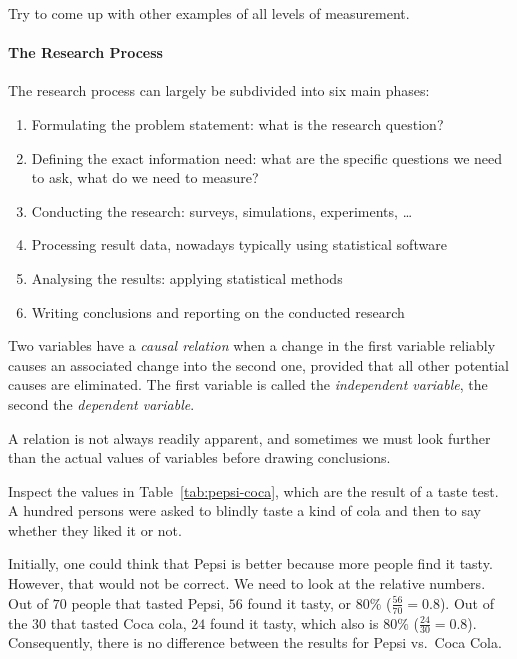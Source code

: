 \begin{exercise}
	Try to come up with other examples of all levels of measurement.
\end{exercise}

\paragraph{The Research Process}

The research process can largely be subdivided into six main phases:

\begin{enumerate}
	\item Formulating the problem statement: what is the research question?
	\item Defining the exact information need: what are the specific questions we need to ask, what do we need to measure?
	\item Conducting the research: surveys, simulations, experiments, \dots
	\item Processing result data, nowadays typically using statistical software
	\item Analysing the results: applying statistical methods
	\item Writing conclusions and reporting on the conducted research
\end{enumerate}

\begin{definition}
    Two variables have a \emph{causal relation} when a change in the first variable reliably causes an associated change into the second one, provided that all other potential causes are eliminated. The first variable is called the \emph{independent variable}, the second the \emph{dependent variable}.
\end{definition}

A relation is not always readily apparent, and sometimes we must look further than the actual values of variables before drawing conclusions.

\begin{example}
    Inspect the values in Table~\ref{tab:pepsi-coca}, which are the result of a taste test. 
    A hundred persons were asked to blindly taste a kind of cola and then to say whether they liked it or not.
    
    Initially, one could think that Pepsi is better because more people find it tasty. 
    However, that would not be correct. We need to look at the relative numbers. 
    Out of $70$ people that tasted Pepsi, $56$ found it tasty, or $80\%$ ($\frac{56}{70} = 0.8$). 
    Out of the $30$ that tasted Coca cola, $24$ found it tasty, which also is $80\%$ ($\frac{24}{30} = 0.8$). 
    Consequently, there is no difference between the results for Pepsi vs.~Coca Cola.
\end{example}    


